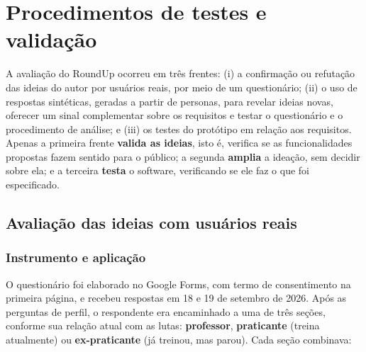 %

\chapter{Procedimentos de testes e validação}
\label{cap:testes}

A avaliação do RoundUp ocorreu em três frentes: (i) a confirmação ou
refutação das ideias do autor por usuários reais, por meio de um
questionário; (ii) o uso de respostas sintéticas, geradas a partir de
personas, para revelar ideias novas, oferecer um sinal complementar sobre
os requisitos e testar o questionário e o procedimento de análise; e
(iii) os testes do protótipo em relação aos requisitos. Apenas a primeira
frente \textbf{valida as ideias}, isto é, verifica se as funcionalidades
propostas fazem sentido para o público; a segunda \textbf{amplia} a
ideação, sem decidir sobre ela; e a terceira \textbf{testa} o software,
verificando se ele faz o que foi especificado.

\section{Avaliação das ideias com usuários reais}
\label{sec:val-survey}

\subsection{Instrumento e aplicação}

O questionário foi elaborado no Google Forms, com termo de consentimento
na primeira página, e recebeu respostas em 18 e 19 de setembro de 2026.
Após as perguntas de perfil, o respondente era encaminhado a uma de três
seções, conforme sua relação atual com as lutas: \textbf{professor},
\textbf{praticante} (treina atualmente) ou \textbf{ex-praticante} (já
treinou, mas parou). Cada seção combinava:

